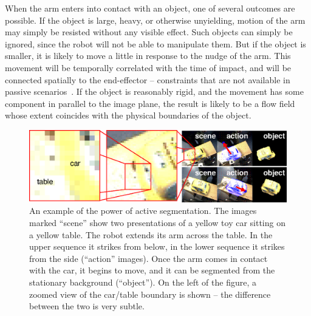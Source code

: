 When the arm enters into contact with an object, one of several
outcomes are possible.  If the object is large, heavy, or otherwise
unyielding, motion of the arm may simply be resisted without any
visible effect.  Such objects can simply be ignored, since the robot
will not be able to manipulate them.  But if the object is smaller, it
is likely to move a little in response to the nudge of the arm.  This
movement will be temporally correlated with the time of impact, and
will be connected spatially to the end-effector -- constraints that
are not available in passive scenarios~\cite{birchfield99depth}.  If
the object is reasonably rigid, and the movement has some component in
parallel to the image plane, the result is likely to be a flow field
whose extent coincides with the physical boundaries of the object.



\begin{figure}[tbh]
  \centerline{\includegraphics[width=\textwidth]{fig-double-yellow}}
  \label{fig:poking-zoom}
  \caption{
%
An example of the power of active segmentation.  The images
marked ``scene'' show two presentations of a yellow toy car
sitting on a yellow table.  The robot extends its arm across
the table.  In the upper sequence it strikes from below, in the
lower sequence it strikes from the side (``action'' images).
Once the arm comes in contact with the car, it begins to move,
and it can be segmented from the stationary background (``object'').
On the left of the figure, a zoomed view of the car/table
boundary is shown -- the difference between the two is very subtle.
%
} 
\end{figure}


